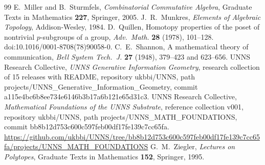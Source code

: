 \begin{thebibliography}{99}
 E.~Miller and B.~Sturmfels, \emph{Combinatorial Commutative Algebra}, Graduate Texts in Mathematics \textbf{227}, Springer, 2005.
 J.~R.~Munkres, \emph{Elements of Algebraic Topology}, Addison-Wesley, 1984.
 D.~Quillen, Homotopy properties of the poset of nontrivial $p$-subgroups of a group, \emph{Adv.\ Math.} \textbf{28} (1978), 101--128. doi:10.1016/0001-8708(78)90058-0.
 C.~E.~Shannon, A mathematical theory of communication, \emph{Bell System Tech.\ J.} \textbf{27} (1948), 379--423 and 623--656.
 UNNS Research Collective, \emph{UNNS Generative Information Geometry}, research collection of 15 releases with README, repository ukbbi/UNNS, path projects/UNNS\_Generative\_Information\_Geometry, commit a115e4bc6b8ee734e6146b3b17a6b121e65d31c3.
 UNNS Research Collective, \emph{Mathematical Foundations of the UNNS Substrate}, reference collection v001, repository ukbbi/UNNS, path projects/UNNS\_MATH\_FOUNDATIONS, commit bb8b12d753c600c597feb00df17fe139c7cc65fa. \url{https://github.com/ukbbi/UNNS/tree/bb8b12d753c600c597feb00df17fe139c7cc65fa/projects/UNNS_MATH_FOUNDATIONS}
 G.~M.~Ziegler, \emph{Lectures on Polytopes}, Graduate Texts in Mathematics \textbf{152}, Springer, 1995.
\end{thebibliography}


